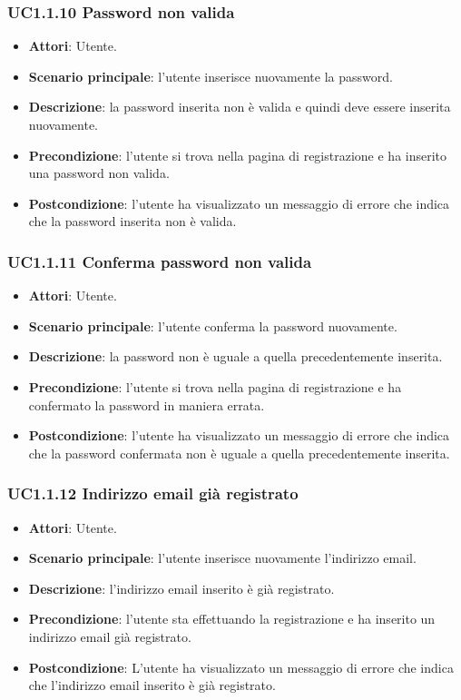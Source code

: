 \subsubsection{UC1.1.10 Password non valida}
\begin{itemize}
\item \textbf{Attori}: Utente.
\item \textbf{Scenario principale}: l'utente inserisce nuovamente la password.
\item \textbf{Descrizione}: la password inserita non è valida e quindi deve essere inserita nuovamente.
\item \textbf{Precondizione}: l'utente si trova nella pagina di registrazione e ha inserito una password non valida.
\item \textbf{Postcondizione}: l'utente ha visualizzato un messaggio di errore che indica che la password inserita non è valida.
\end{itemize}
\subsubsection{UC1.1.11 Conferma password non valida}
\begin{itemize}
\item \textbf{Attori}: Utente.
\item \textbf{Scenario principale}: l'utente conferma la password nuovamente.
\item \textbf{Descrizione}: la password non è uguale a quella precedentemente inserita.
\item \textbf{Precondizione}: l'utente si trova nella pagina di registrazione e ha confermato la password in maniera errata.
\item \textbf{Postcondizione}: l'utente ha visualizzato un messaggio di errore che indica che la password confermata non è uguale a quella precedentemente inserita.
\end{itemize}
\subsubsection{UC1.1.12 Indirizzo email già registrato}
\begin{itemize}
\item \textbf{Attori}: Utente.
\item \textbf{Scenario principale}: l'utente inserisce nuovamente l'indirizzo email.
\item \textbf{Descrizione}: l'indirizzo email inserito è già registrato.
\item \textbf{Precondizione}: l'utente sta effettuando la registrazione e ha inserito un indirizzo email già registrato.
\item \textbf{Postcondizione}: L'utente ha visualizzato un messaggio di errore che indica che l'indirizzo email inserito è già registrato.
\end{itemize}
